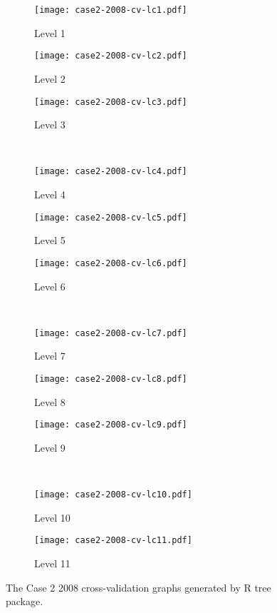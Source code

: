 \begin{appendices}
\begin{figure}[!ht] \centering
	\captionsetup[subfigure]{width=2.0in}
	\begin{subfigure}[t]{0.32\textwidth}
		\texttt{[image: case2-2008-cv-lc1.pdf]}
		\caption{Level 1}
	\end{subfigure}
	\begin{subfigure}[t]{0.32\textwidth}
		\texttt{[image: case2-2008-cv-lc2.pdf]}
		\caption{Level 2}
	\end{subfigure}
	\begin{subfigure}[t]{0.32\textwidth}
		\texttt{[image: case2-2008-cv-lc3.pdf]}
		\caption{Level 3}
	\end{subfigure}\\
	\vspace{5pt}
	\begin{subfigure}[t]{0.32\textwidth}
		\texttt{[image: case2-2008-cv-lc4.pdf]}
		\caption{Level 4}
	\end{subfigure}
	\begin{subfigure}[t]{0.32\textwidth}
		\texttt{[image: case2-2008-cv-lc5.pdf]}
		\caption{Level 5}
	\end{subfigure}
	\begin{subfigure}[t]{0.32\textwidth}
		\texttt{[image: case2-2008-cv-lc6.pdf]}
		\caption{Level 6}
	\end{subfigure}\\
	\vspace{5pt}	
	\begin{subfigure}[t]{0.32\textwidth}
		\texttt{[image: case2-2008-cv-lc7.pdf]}
		\caption{Level 7}
	\end{subfigure}
	\begin{subfigure}[t]{0.32\textwidth}
		\texttt{[image: case2-2008-cv-lc8.pdf]}
		\caption{Level 8}
	\end{subfigure}
	\begin{subfigure}[t]{0.32\textwidth}
		\texttt{[image: case2-2008-cv-lc9.pdf]}
		\caption{Level 9}
	\end{subfigure}\\
	\vspace{5pt}
	\begin{subfigure}[t]{0.32\textwidth}
		\texttt{[image: case2-2008-cv-lc10.pdf]}
		\caption{Level 10}
	\end{subfigure}
	\begin{subfigure}[t]{0.32\textwidth}
		\texttt{[image: case2-2008-cv-lc11.pdf]}
		\caption{Level 11}
	\end{subfigure}
	\vspace{5pt}
	\caption[The Case 2 2008 cross-validation graphs generated by R tree package.]{The Case 2 2008 cross-validation graphs generated by R tree package.}
	\label{fig: appendix-fig.c12.cv}
\end{figure}


\end{appendices}
